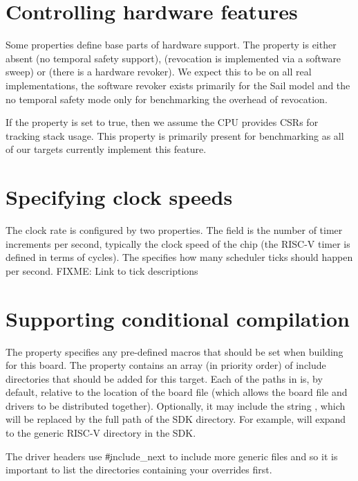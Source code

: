 \section{Controlling hardware features}

Some properties define base parts of hardware support.
The  property is either absent (no temporal safety support),  (revocation is implemented via a software sweep) or  (there is a hardware revoker).
We expect this to be  on all real implementations, the software revoker exists primarily for the Sail model and the no temporal safety mode only for benchmarking the overhead of revocation.

If the  property is set to true, then we assume the CPU provides CSRs for tracking stack usage.
This property is primarily present for benchmarking as all of our targets currently implement this feature.

\section{Specifying clock speeds}

The clock rate is configured by two properties.
The  field is the number of timer increments per second, typically the clock speed of the chip (the RISC-V timer is defined in terms of cycles).
The  specifies how many scheduler ticks should happen per second.
FIXME: Link to tick descriptions

\section{Supporting conditional compilation}

The  property specifies any pre-defined macros that should be set when building for this board.
The  property contains an array (in priority order) of include directories that should be added for this target.
Each of the paths in  is, by default, relative to the location of the board file (which allows the board file and drivers to be distributed together).
Optionally, it may include the string , which will be replaced by the full path of the SDK directory.
For example,  will expand to the generic RISC-V directory in the SDK.

The driver headers use \c{#include_next} to include more generic files and so it is important to list the directories containing your overrides first.

